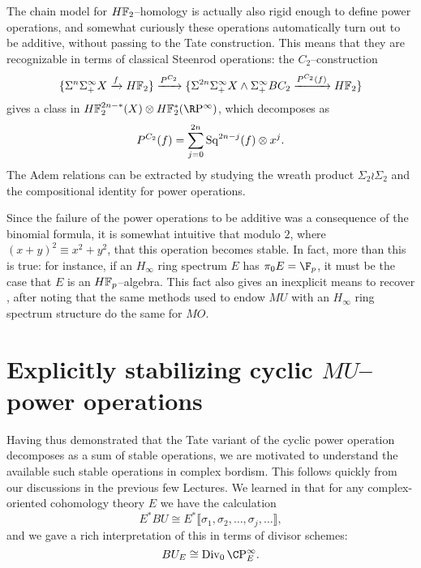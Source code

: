 \begin{example}
The chain model for $\HFtwo$--homology is actually also rigid enough to define power operations, and somewhat curiously these operations automatically turn out to be additive, without passing to the Tate construction.  This means that they are recognizable in terms of classical Steenrod operations: the $C_2$--construction \[\{\Susp^n \Susp^\infty_+ X \xrightarrow{f} \HFtwo\} \xrightarrow{P^{C_2}} \{\Susp^{2n} \Susp^\infty_+ X \sm \Susp^\infty_+ BC_2 \xrightarrow{P^{C_2}(f)} \HFtwo\}\] gives a class in $\HFtwo^{2n-*}(X) \otimes \HFtwo^*(\RP^\infty)$, which decomposes as \[P^{C_2}(f) = \sum_{j=0}^{2n} \operatorname{Sq}^{2n-j}(f) \otimes x^j.\]  The Adem relations can be extracted by studying the wreath product $\Sigma_2 \wr \Sigma_2$ and the compositional identity for power operations.
\end{example}

\begin{remark}\label{HinftyRingsModp}
Since the failure of the power operations to be additive was a consequence of the binomial formula, it is somewhat intuitive that modulo $2$, where $(x + y)^2 \equiv x^2 + y^2$, that this operation becomes stable.  In fact, more than this is true: for instance, if an $H_\infty$ ring spectrum $E$ has $\pi_0 E = \F_p$, it must be the case that $E$ is an $\HFp$--algebra.  This fact also gives an inexplicit means to recover , after noting that the same methods used to endow $MU$ with an $H_\infty$ ring spectrum structure do the same for $MO$.
\end{remark}















\section{Explicitly stabilizing cyclic \texorpdfstring{$MU$}{MU}--power operations}\label{StabilizingTheMUSteenrodOps}

Having thus demonstrated that the Tate variant of the cyclic power operation decomposes as a sum of stable operations, we are motivated to understand the available such stable operations in complex bordism.  This follows quickly from our discussions in the previous few Lectures.  We learned in  that for any complex-oriented cohomology theory $E$ we have the calculation \[E^* BU \cong E^*\llbracket \sigma_1, \sigma_2, \ldots, \sigma_j, \ldots\rrbracket,\] and we gave a rich interpretation of this in terms of divisor schemes: \[BU_E \cong \Div_0 \CP^\infty_E.\]

